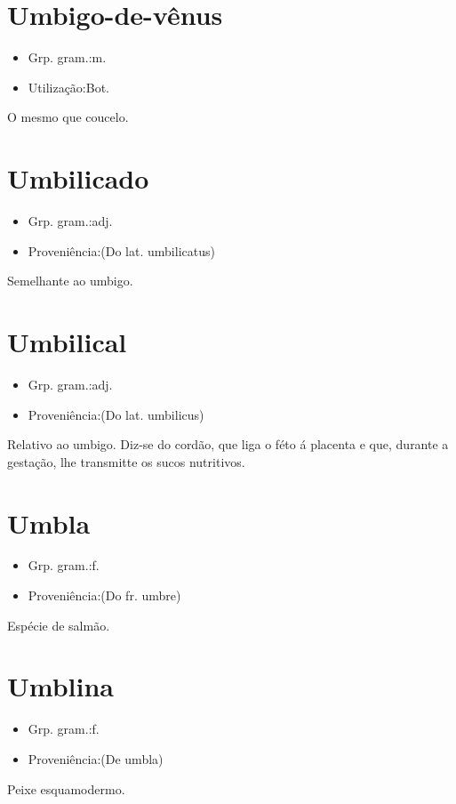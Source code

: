 \documentclass{article}
\begin{document}
\section{Umbigo-de-vênus}
\begin{itemize}
\item {Grp. gram.:m.}
\end{itemize}
\begin{itemize}
\item {Utilização:Bot.}
\end{itemize}
O mesmo que \textunderscore coucelo\textunderscore .
\section{Umbilicado}
\begin{itemize}
\item {Grp. gram.:adj.}
\end{itemize}
\begin{itemize}
\item {Proveniência:(Do lat. \textunderscore umbilicatus\textunderscore )}
\end{itemize}
Semelhante ao umbigo.
\section{Umbilical}
\begin{itemize}
\item {Grp. gram.:adj.}
\end{itemize}
\begin{itemize}
\item {Proveniência:(Do lat. \textunderscore umbilicus\textunderscore )}
\end{itemize}
Relativo ao umbigo.
Diz-se do cordão, que liga o féto á placenta e que, durante a gestação, lhe transmitte os sucos nutritivos.
\section{Umbla}
\begin{itemize}
\item {Grp. gram.:f.}
\end{itemize}
\begin{itemize}
\item {Proveniência:(Do fr. \textunderscore umbre\textunderscore )}
\end{itemize}
Espécie de salmão.
\section{Umblina}
\begin{itemize}
\item {Grp. gram.:f.}
\end{itemize}
\begin{itemize}
\item {Proveniência:(De \textunderscore umbla\textunderscore )}
\end{itemize}
Peixe esquamodermo.
\end{document}
